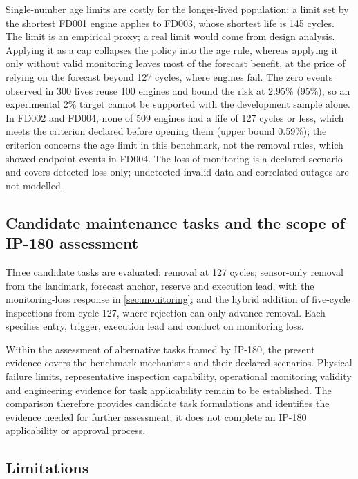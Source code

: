 \documentclass[preprint,12pt]{elsarticle}
\begin{document}
Single-number age limits are costly for the longer-lived population: a limit set by the shortest FD001 engine applies to FD003, whose shortest life is 145 cycles. The limit is an empirical proxy; a real limit would come from design analysis. Applying it as a cap collapses the policy into the age rule, whereas applying it only without valid monitoring leaves most of the forecast benefit, at the price of relying on the forecast beyond 127 cycles, where engines fail. The zero events observed in 300 lives reuse 100 engines and bound the risk at 2.95\% (95\%), so an experimental 2\% target cannot be supported with the development sample alone. In FD002 and FD004, none of 509 engines had a life of 127 cycles or less, which meets the criterion declared before opening them (upper bound 0.59\%); the criterion concerns the age limit in this benchmark, not the removal rules, which showed endpoint events in FD004. The loss of monitoring is a declared scenario and covers detected loss only; undetected invalid data and correlated outages are not modelled.

\subsection{Candidate maintenance tasks and the scope of IP-180 assessment}\label{sec:task-implications}

Three candidate tasks are evaluated: removal at 127 cycles; sensor-only removal from the landmark, forecast anchor, reserve and execution lead, with the monitoring-loss response in \cref{sec:monitoring}; and the hybrid addition of five-cycle inspections from cycle 127, where rejection can only advance removal. Each specifies entry, trigger, execution lead and conduct on monitoring loss.


Within the assessment of alternative tasks framed by IP-180, the present evidence covers the benchmark mechanisms and their declared scenarios. Physical failure limits, representative inspection capability, operational monitoring validity and engineering evidence for task applicability remain to be established. The comparison therefore provides candidate task formulations and identifies the evidence needed for further assessment; it does not complete an IP-180 applicability or approval process.

\subsection{Limitations}
\end{document}
